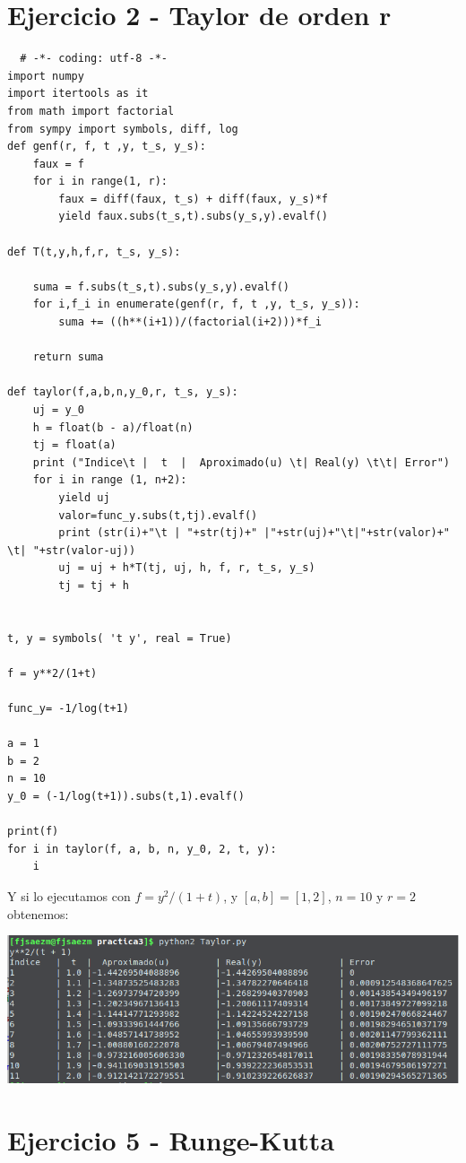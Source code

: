\documentclass[11pt]{article}
\begin{document}
\section{Ejercicio 2 - Taylor de orden r}
\begin{lstlisting}
  # -*- coding: utf-8 -*-
import numpy
import itertools as it
from math import factorial
from sympy import symbols, diff, log
def genf(r, f, t ,y, t_s, y_s):
    faux = f
    for i in range(1, r):
        faux = diff(faux, t_s) + diff(faux, y_s)*f
        yield faux.subs(t_s,t).subs(y_s,y).evalf()

def T(t,y,h,f,r, t_s, y_s):

    suma = f.subs(t_s,t).subs(y_s,y).evalf()
    for i,f_i in enumerate(genf(r, f, t ,y, t_s, y_s)):
        suma += ((h**(i+1))/(factorial(i+2)))*f_i

    return suma

def taylor(f,a,b,n,y_0,r, t_s, y_s):
    uj = y_0
    h = float(b - a)/float(n)
    tj = float(a)
    print ("Indice\t |  t  |  Aproximado(u) \t| Real(y) \t\t| Error")
    for i in range (1, n+2):
        yield uj
        valor=func_y.subs(t,tj).evalf()
        print (str(i)+"\t | "+str(tj)+" |"+str(uj)+"\t|"+str(valor)+"  \t| "+str(valor-uj))
        uj = uj + h*T(tj, uj, h, f, r, t_s, y_s)
        tj = tj + h


t, y = symbols( 't y', real = True)

f = y**2/(1+t)

func_y= -1/log(t+1)

a = 1
b = 2
n = 10
y_0 = (-1/log(t+1)).subs(t,1).evalf()

print(f)
for i in taylor(f, a, b, n, y_0, 2, t, y):
    i
  \end{lstlisting}

Y si lo ejecutamos con $f=y^2/(1+t)$, y $[a,b]=[1,2]$, $n=10$ y $r=2$ obtenemos:
\begin{center}
\includegraphics[scale=0.5]{Taylor.png}
  \end{center}
\section{Ejercicio 5 - Runge-Kutta }
\end{document}
